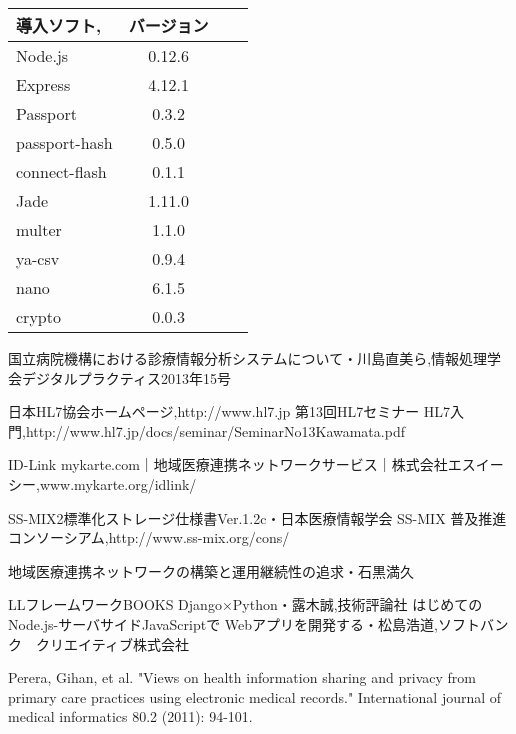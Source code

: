\documentclass[12pt]{sotsuron}
\begin{document}
\begin{table}[htb]
	\begin{tabular}{|l|c|r|r|}\hline
	導入ソフト, & バージョン \\ \hline \hline
	Node.js & 0.12.6 \\ \hline
	Express & 4.12.1 \\ \hline
	Passport & 0.3.2 \\ \hline
	passport-hash & 0.5.0 \\ \hline
	connect-flash & 0.1.1 \\ \hline
	Jade & 1.11.0 \\ \hline
	multer & 1.1.0  \\ \hline
	ya-csv & 0.9.4 \\ \hline
	nano & 6.1.5 \\ \hline
	crypto & 0.0.3  \\ \hline


	\end{tabular}
\end{table}



\begin{thebibliography}{12}
	 国立病院機構における診療情報分析システムについて・川島直美ら,情報処理学会デジタルプラクティス2013年15号


	 日本HL7協会ホームページ,http://www.hl7.jp
   第13回HL7セミナー HL7入門,http://www.hl7.jp/docs/seminar/SeminarNo13Kawamata.pdf

   ID-Link mykarte.com｜地域医療連携ネットワークサービス｜株式会社エスイーシー,www.mykarte.org/idlink/


	 SS-MIX2標準化ストレージ仕様書Ver.1.2c・日本医療情報学会
	 SS-MIX 普及推進コンソーシアム,http://www.ss-mix.org/cons/



	 地域医療連携ネットワークの構築と運用継続性の追求・石黒満久

   LLフレームワークBOOKS Django×Python・露木誠,技術評論社
   はじめてのNode.js-サーバサイドJavaScriptで Webアプリを開発する・松島浩道,ソフトバンク　クリエイティブ株式会社

   Perera, Gihan, et al. "Views on health information sharing and privacy from primary care practices using electronic medical records." International journal of medical informatics 80.2 (2011): 94-101.


\end{thebibliography}


\clearpage

\listoffigures
\clearpage

\listoftables
\clearpage
\end{document}
